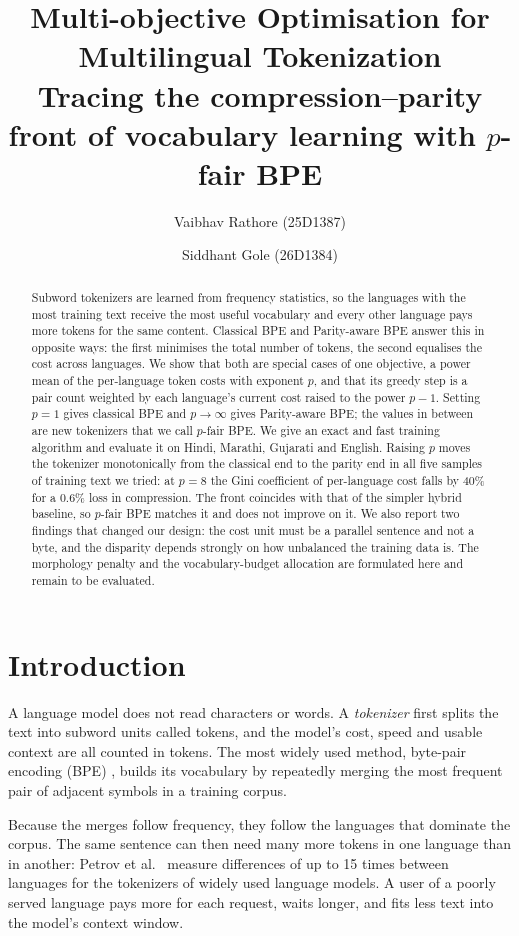 \documentclass[11pt,a4paper]{article}
\title{\textbf{Multi-objective Optimisation for Multilingual Tokenization}\\[4pt]
\large Tracing the compression--parity front of vocabulary learning with $p$-fair BPE}
\author{Vaibhav Rathore (25D1387) \and Siddhant Gole (26D1384)\\[2pt]
}
\date{}
\theoremstyle{remark}
\begin{document}
\maketitle

\begin{abstract}
\noindent
Subword tokenizers are learned from frequency statistics, so the languages with the most
training text receive the most useful vocabulary and every other language pays more tokens
for the same content. Classical BPE and Parity-aware BPE answer this in opposite ways: the
first minimises the total number of tokens, the second equalises the cost across languages.
We show that both are special cases of one objective, a power mean of the per-language token
costs with exponent $p$, and that its greedy step is a pair count weighted by each
language's current cost raised to the power $p-1$. Setting $p=1$ gives classical BPE and
$p\to\infty$ gives Parity-aware BPE; the values in between are new tokenizers that we call
$p$-fair BPE. We give an exact and fast training algorithm and evaluate it on Hindi,
Marathi, Gujarati and English. Raising $p$ moves the tokenizer monotonically from the
classical end to the parity end in all five samples of training text we tried: at $p=8$ the
Gini coefficient of per-language cost falls by 40\% for a 0.6\% loss in compression. The
front coincides with that of the simpler hybrid baseline, so $p$-fair BPE matches it and
does not improve on it. We also report two findings that changed our design: the cost unit
must be a parallel sentence and not a byte, and the disparity depends strongly on how
unbalanced the training data is. The morphology penalty and the vocabulary-budget
allocation are formulated here and remain to be evaluated.
\end{abstract}

\section{Introduction}

A language model does not read characters or words. A \emph{tokenizer} first splits the
text into subword units called tokens, and the model's cost, speed and usable context are
all counted in tokens. The most widely used method, byte-pair encoding (BPE)
\cite{gage1994,sennrich2016}, builds its vocabulary by repeatedly merging the most
frequent pair of adjacent symbols in a training corpus.

Because the merges follow frequency, they follow the languages that dominate the corpus.
The same sentence can then need many more tokens in one language than in another: Petrov
et al.\ \cite{petrov2023} measure differences of up to 15 times between languages for
the tokenizers of widely used language models. A user of a poorly served language pays more for each request, waits
longer, and fits less text into the model's context window.
\end{document}

